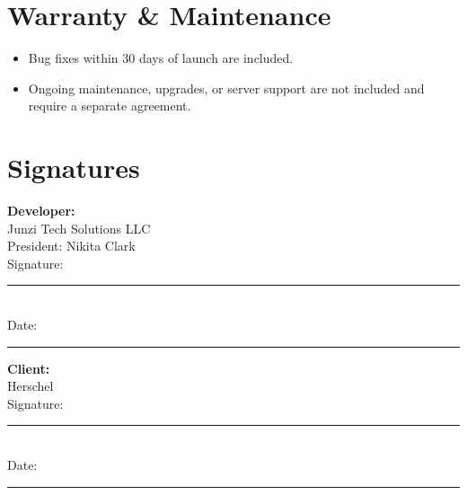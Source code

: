 \documentclass[11pt,letterpaper]{article}
\newcommand{\ClientName}{Herschel}
\begin{document}
\section{Warranty \& Maintenance}
\begin{itemize}[leftmargin=*]
\item Bug fixes within 30 days of launch are included.
\item Ongoing maintenance, upgrades, or server support are not included and require a separate agreement.
\end{itemize}

\vspace{2em}

\section*{Signatures}

\begin{minipage}{0.45\textwidth}
\textbf{Developer:}\\
Junzi Tech Solutions LLC\\
President: Nikita Clark\\[2em]
Signature: \rule{6cm}{0.4pt}\\[0.5em]
Date: \rule{4cm}{0.4pt}
\end{minipage}
\hfill
\begin{minipage}{0.45\textwidth}
\textbf{Client:}\\
\ClientName{}\\[3em]
Signature: \rule{6cm}{0.4pt}\\[0.5em]
Date: \rule{4cm}{0.4pt}
\end{minipage}
\end{document}
